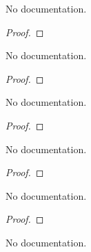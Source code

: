 \begin{theorem}\label{lower_iff_lipschitz}
        \leanok
                No documentation.
    \end{theorem}

\begin{proof}
    \leanok
\end{proof}

\begin{theorem}\label{lipshictz_iff_lnorm_sub_convex}
        \leanok
                No documentation.
    \end{theorem}

\begin{proof}
    \leanok
\end{proof}

\begin{theorem}\label{lower_iff_lnorm_sub_convex}
        \leanok
                No documentation.
    \end{theorem}

\begin{proof}
    \leanok
\end{proof}

\begin{theorem}\label{Strongly_Convex_Bound}
        \leanok
                No documentation.
    \end{theorem}

\begin{proof}
    \leanok
\end{proof}

\begin{theorem}\label{stronglyConvexOn_def}
        \leanok
                No documentation.
    \end{theorem}

\begin{proof}
    \leanok
\end{proof}

\begin{theorem}\label{Strongly_Convex_Unique_Minima}
        \leanok
                No documentation.
    \end{theorem}

